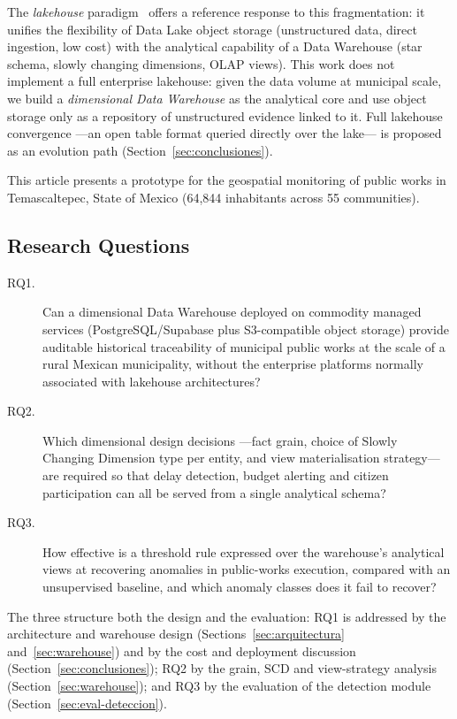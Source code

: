 \documentclass[runningheads]{llncs}
\renewcommand{\_}{\origunderscore\allowbreak}
\begin{document}
The \textit{lakehouse} paradigm~\cite{Zaharia2021} offers a reference response to this fragmentation: it unifies the flexibility of Data Lake object storage (unstructured data, direct ingestion, low cost) with the analytical capability of a Data Warehouse (star schema, slowly changing dimensions, OLAP views). This work does not implement a full enterprise lakehouse: given the data volume at municipal scale, we build a \emph{dimensional Data Warehouse} as the analytical core and use object storage only as a repository of unstructured evidence linked to it. Full lakehouse convergence ---an open table format queried directly over the lake--- is proposed as an evolution path (Section~\ref{sec:conclusiones}).

This article presents a prototype for the geospatial monitoring of public works in Temascaltepec, State of Mexico (64,844 inhabitants across 55 communities).

\subsection*{Research Questions}

\begingroup
\begin{description}
\item[RQ1.] Can a dimensional Data Warehouse deployed on commodity managed services (PostgreSQL/Supabase plus S3-compatible object storage) provide auditable historical traceability of municipal public works at the scale of a rural Mexican municipality, without the enterprise platforms normally associated with lakehouse architectures?
\item[RQ2.] Which dimensional design decisions ---fact grain, choice of Slowly Changing Dimension type per entity, and view materialisation strategy--- are required so that delay detection, budget alerting and citizen participation can all be served from a single analytical schema?
\item[RQ3.] How effective is a threshold rule expressed over the warehouse's analytical views at recovering anomalies in public-works execution, compared with an unsupervised baseline, and which anomaly classes does it fail to recover?
\end{description}

The three structure both the design and the evaluation: RQ1 is addressed by the architecture and warehouse design (Sections~\ref{sec:arquitectura} and~\ref{sec:warehouse}) and by the cost and deployment discussion (Section~\ref{sec:conclusiones}); RQ2 by the grain, SCD and view-strategy analysis (Section~\ref{sec:warehouse}); and RQ3 by the evaluation of the detection module (Section~\ref{sec:eval-deteccion}).
\endgroup
\end{document}
